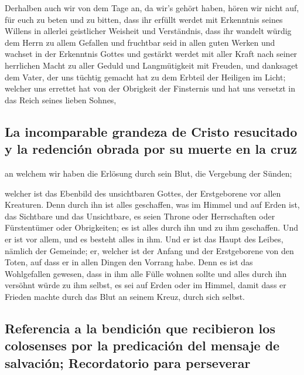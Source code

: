 Derhalben auch wir von dem Tage an, da wir's gehört
haben, hören wir nicht auf, für euch zu beten und zu bitten, dass ihr
erfüllt werdet mit Erkenntnis seines Willens in allerlei geistlicher
Weisheit und Verständnis,  dass ihr wandelt würdig dem
Herrn zu allem Gefallen und fruchtbar seid in allen guten Werken
 und wachset in der Erkenntnis Gottes und gestärkt werdet
mit aller Kraft nach seiner herrlichen Macht zu aller Geduld und
Langmütigkeit mit Freuden,  und danksaget dem Vater, der
uns tüchtig gemacht hat zu dem Erbteil der Heiligen im Licht;
 welcher uns errettet hat von der Obrigkeit der
Finsternis und hat uns versetzt in das Reich seines lieben Sohnes,

\hypertarget{la-incomparable-grandeza-de-cristo-resucitado-y-la-redenciuxf3n-obrada-por-su-muerte-en-la-cruz}{%
\subsection{La incomparable grandeza de Cristo resucitado y la redención
obrada por su muerte en la
cruz}\label{la-incomparable-grandeza-de-cristo-resucitado-y-la-redenciuxf3n-obrada-por-su-muerte-en-la-cruz}}

 an welchem wir haben die Erlösung durch sein Blut, die
Vergebung der Sünden;

 welcher ist das Ebenbild des unsichtbaren Gottes, der
Erstgeborene vor allen Kreaturen.  Denn durch ihn ist
alles geschaffen, was im Himmel und auf Erden ist, das Sichtbare und das
Unsichtbare, es seien Throne oder Herrschaften oder Fürstentümer oder
Obrigkeiten; es ist alles durch ihn und zu ihm geschaffen.
 Und er ist vor allem, und es besteht alles in ihm.
 Und er ist das Haupt des Leibes, nämlich der Gemeinde;
er, welcher ist der Anfang und der Erstgeborene von den Toten, auf dass
er in allen Dingen den Vorrang habe.  Denn es ist das
Wohlgefallen gewesen, dass in ihm alle Fülle wohnen sollte
 und alles durch ihn versöhnt würde zu ihm selbst, es sei
auf Erden oder im Himmel, damit dass er Frieden machte durch das Blut an
seinem Kreuz, durch sich selbst.

\hypertarget{referencia-a-la-bendiciuxf3n-que-recibieron-los-colosenses-por-la-predicaciuxf3n-del-mensaje-de-salvaciuxf3n-recordatorio-para-perseverar}{%
\subsection{Referencia a la bendición que recibieron los colosenses por
la predicación del mensaje de salvación; Recordatorio para
perseverar}\label{referencia-a-la-bendiciuxf3n-que-recibieron-los-colosenses-por-la-predicaciuxf3n-del-mensaje-de-salvaciuxf3n-recordatorio-para-perseverar}}

